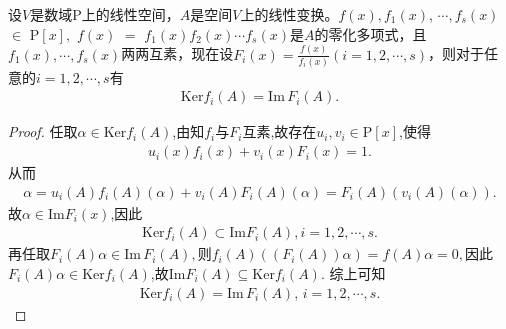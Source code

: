 \documentclass[../../main.tex]{subfiles}%
\begin{document}
\begin{corollary}
设$V$是数域$\mathrm{P}$上的线性空间，$A$是空间$V$上的线性变换。$f(x),$$f_1(x)$, $\cdots,$$f_s(x)$ $\in $ $\mathrm{P}[x],$ $f(x)$ $=$ $f_1(x)f_2(x)\cdots f_s(x)$是$A$的零化多项式，且$f_1(x), \cdots, f_s(x)$两两互素，现在设$F_i(x) = \frac{f(x)}{f_i(x)}$$(i = 1, 2, \cdots, s)$，则对于任意的$i = 1, 2, \cdots, s$有
\begin{align*}
\text{Ker} f_i(A) = \text{Im}\, F_i(A).
\end{align*}
\end{corollary}
\begin{proof}

任取$\alpha \in \text{Ker}f_i(A)$,由知$f_i$与$F_i$互素,故存在$u_i,v_i\in \mathrm{P}[x]$,使得
\begin{align*}
u_i(x)f_i(x)+v_i(x)F_i(x)=1.
\end{align*}
从而
\begin{align*}
\alpha=u_i(A)f_i(A)(\alpha) + v_i(A)F_i(A)(\alpha) =  F_i(A)(v_i(A)(\alpha)).
\end{align*}
故$\alpha \in \text{Im}F_i(x)$,因此
\begin{align}\label{eq::9-k3434g2g}
\text{Ker}f_i(A)\subset \text{Im}F_i(A),i=1,2,\cdots,s.
\end{align}
再任取$F_i(A)\alpha \in \text{Im}\, F_i(A),$则$f_i(A)((F_i(A))\alpha)=f(A)\alpha=0,$因此$F_i(A)\alpha\in \text{Ker}f_i(A)$,故$\text{Im}F_i(A)\subseteq \text{Ker}f_i(A)$.
综上可知
\begin{align*}
\text{Ker} f_i(A) = \text{Im}\, F_i(A),\,i=1,2,\cdots,s.
\end{align*}

\end{proof}
\end{document}
